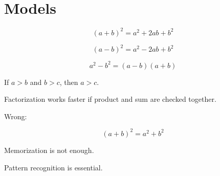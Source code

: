 \chapter{Models}


\begin{formulasheet}

\[
(a+b)^2=a^2+2ab+b^2
\]

\[
(a-b)^2=a^2-2ab+b^2
\]

\[
a^2-b^2=(a-b)(a+b)
\]

\end{formulasheet}


\begin{theorembox}

If \(a>b\) and \(b>c\), then \(a>c\).

\end{theorembox}


\begin{trickbox}

Factorization works faster if product and sum are checked together.

\end{trickbox}


\begin{mistakebox}

Wrong:

\[
(a+b)^2=a^2+b^2
\]

\end{mistakebox}


\begin{strategybox}

Memorization is not enough.

Pattern recognition is essential.

\end{strategybox}


